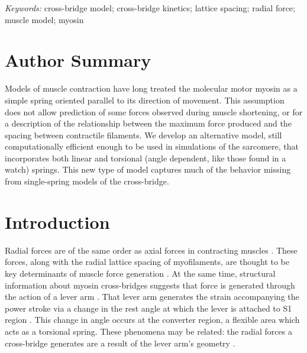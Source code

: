 \documentclass[10pt]{article}
\newcommand{\citep}[1]{\cite{#1}} %
\begin{document}
\emph{Keywords:} cross-bridge model; cross-bridge kinetics; lattice spacing; radial force; muscle model; myosin 


\section*{Author Summary} %
Models of muscle contraction have long treated the molecular motor myosin as a simple spring oriented parallel to its direction of movement. 
This assumption does not allow prediction of some forces observed during muscle shortening, or for a description of the relationship between the maximum force produced and the spacing between contractile filaments. 
We develop an alternative model, still computationally efficient enough to be used in simulations of the sarcomere, that incorporates both linear and torsional (angle dependent, like those found in a watch) springs. 
This new type of model captures much of the behavior missing from single-spring models of the cross-bridge.


\section*{Introduction} %

Radial forces are of the same order as axial forces in contracting muscles \citep{Maughan1981, Cecchi1990, Millman1998}. 
These forces, along with the radial lattice spacing of myofilaments, are thought to be key determinants of muscle force generation \citep{Fuchs2005}. 
At the same time, structural information about myosin cross-bridges suggests that force is generated through the action of a lever arm \citep{Rayment1993, Uyeda1996, Huxley2000}.
That lever arm generates the strain accompanying the power stroke via a change in the rest angle at which the lever is attached to S1 region \citep{Huxley2000, Houdusse2001}. 
This change in angle occurs at the converter region, a flexible area which acts as a torsional spring. 
These phenomena may be related: the radial forces a cross-bridge generates are a result of the lever arm's geometry \citep{Schoenberg1980b}. 
\end{document}
